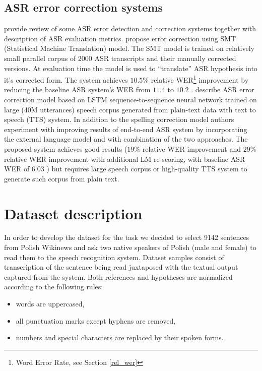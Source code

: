\documentclass[10pt, a4paper]{article}
\begin{document}
\subsection{ASR error correction systems}
\cite{ASREDC:review} provide review of some ASR error detection and correction systems together with description of ASR evaluation metrics.
\cite{cucu_statistical_2013} propose error correction using SMT (Statistical Machine Translation)
model. The SMT model is trained on relatively small parallel corpus of 2000 ASR transcripts and
their manually corrected versions. At evaluation time the model is used to ``translate'' ASR
hypothesis into it's corrected form. The system achieves $ 10.5 \% $ relative WER\footnote{Word
Error Rate, see Section \ref{rel_wer}} improvement  by reducing the baseline ASR system's 
WER from $ 11.4 $ to $ 10.2 $ .
\cite{guo2019spelling} describe ASR error correction model based on LSTM sequence-to-sequence
neural network trained on large (40M utterances) speech corpus generated from plain-text data with
text to speech (TTS) system. In addition to the spelling correction model authors experiment with
improving results of end-to-end ASR system by incorporating the external language model and with combination of the two approaches. The proposed system achieves good results ($19\%$ relative WER improvement and $29\%$ relative WER improvement with additional LM re-scoring, with baseline ASR WER of $6.03$ ) but requires large speech corpus or high-quality TTS system to generate such corpus from plain text.

\section{Dataset description}
In order to develop the dataset for the task
we decided to select 9142 sentences from Polish Wikinews \cite{Wikinews19} and 
ask two native speakers of Polish (male and female) to read them
to the speech recognition system. %
Dataset samples consist of transcription of the sentence
being read juxtaposed with 
the textual output captured from the system.
Both references and hypotheses are normalized according to the following rules:
\begin{itemize}
	\item words are uppercased,
	\item all punctuation marks except hyphens are removed,
	\item numbers and special characters are replaced by their spoken forms.
\end{itemize}
\end{document}
